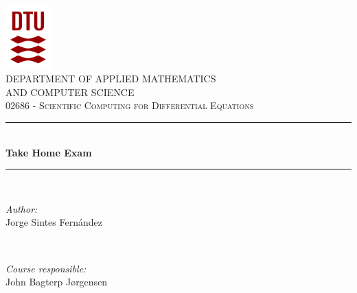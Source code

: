 \begin{titlepage}

\newcommand{\HRule}{\rule{\linewidth}{0.5mm}} %

\center %
 

\includegraphics[width=0.13\textwidth]{images/Corp_Red_RGB.pdf}\\[1cm] %
\textsc{\Large DEPARTMENT OF APPLIED MATHEMATICS \\[0.2cm] AND COMPUTER SCIENCE}\\[0.5cm] %
\textsc{\large 02686 - Scientific Computing for Differential Equations}\\[0.4cm] %


\HRule \\[0.9cm]
{ \huge \bfseries Take Home Exam}\\[0.4cm] %
\HRule \\[1.5cm]
 

\begin{minipage}{0.5\textwidth}
\begin{flushleft} \large
\emph{Author:}\\
Jorge Sintes Fernández
\end{flushleft}
\end{minipage}
~
\begin{minipage}{0.3\textwidth}
\begin{flushright} \large
\emph{Course responsible:} \\
John Bagterp Jørgensen
\end{flushright}
\end{minipage}\\[2cm]


\end{titlepage}
